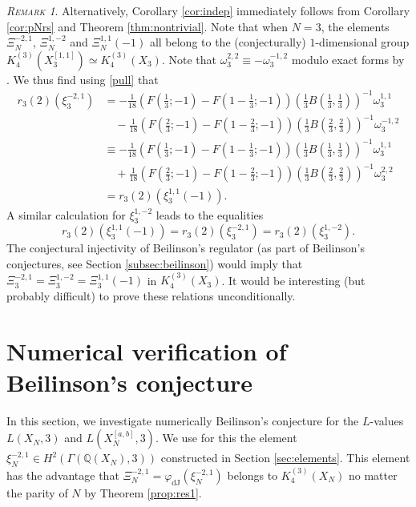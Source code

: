 \documentclass[11pt,a4,leqno]{amsart}
\theoremstyle{my theoremstyle}
\theoremstyle{dfn}
\theoremstyle{remark}
\newtheorem{rmk}[thm]{{\scshape Remark}}
\renewcommand{\1}{\mathbbm{1}}
\newcommand{\Q}{\mathbb{Q}}
\numberwithin{equation}{section}
\begin{document}
\begin{rmk}
Alternatively, Corollary \ref{cor:indep} immediately follows from Corollary \ref{cor:pNrs} and Theorem \ref{thm:nontrivial}. 
    Note that when $N=3$, the elements $\Xi_N^{-2,1}$, $\Xi_N^{1,-2}$ and $\Xi_N^{1,1}(-1)$ all belong to the (conjecturally) $1$-dimensional group $K_4^{(3)}(X_3^{[1,1]})\simeq K_4^{(3)}(X_3)$. Note that $\omega_3^{2,2}\equiv -\omega_3^{-1,2}$ modulo exact forms by \cite[Lemma 4.19]{Ots11}. We thus find using \eqref{pull} that 
    \begin{align*}
    r_3(2)(\xi_3^{-2,1})&=-\frac1{18} \left(  F\left(\frac{1}3; -1\right) - F\left(1-\frac{1}3; -1\right) \right) \left( \frac{1}{3} B\left( \frac{1}{3}, \frac{1}{3} \right)  \right)^{-1} \omega_3^{1, 1}\\
    &\quad -\frac1{18} \left(  F\left(\frac{2}3; -1\right) - F\left(1-\frac{2}3; -1\right) \right) \left( \frac{1}{3} B\left( \frac{2}{3}, \frac{2}{3} \right)  \right)^{-1} \omega_3^{-1, 2} \\
    &\equiv -\frac1{18} \left(  F\left(\frac{1}3; -1\right) - F\left(1-\frac{1}3; -1\right) \right) \left( \frac{1}{3} B\left( \frac{1}{3}, \frac{1}{3} \right)  \right)^{-1} \omega_3^{1, 1}\\
    &\quad +\frac1{18} \left(  F\left(\frac{2}3; -1\right) - F\left(1-\frac{2}3; -1\right) \right) \left( \frac{1}{3} B\left( \frac{2}{3}, \frac{2}{3} \right)  \right)^{-1} \omega_3^{2, 2} \\
    & = r_3(2)(\xi_3^{1,1}(-1)).
    \end{align*}
    A similar calculation for $\xi_3^{1,-2}$ leads to the equalities
    \[
    r_3(2)(\xi_3^{1,1}(-1))=r_3(2)(\xi_3^{-2,1})=r_3(2)(\xi_3^{1,-2}).
    \]
    The conjectural injectivity of Beilinson's regulator (as part of Beilinson's conjectures, see Section \ref{subsec:beilinson}) would imply that $\Xi_3^{-2,1}
    =\Xi_3^{1,-2}=\Xi_3^{1,1}(-1)$ in $K_4^{(3)}(X_3)$. It would be interesting (but probably difficult) to prove these relations unconditionally. 
\end{rmk}

\section{Numerical verification of Beilinson's conjecture} \label{sec:num}

In this section, we investigate numerically Beilinson's conjecture for the $L$-values $L(X_N, 3)$ and $L(X_N^{[a,b]}, 3)$. We use for this the element $\xi_N^{-2,1}\in H^2(\Gamma(\Q(X_N),3))$ constructed in Section \ref{sec:elements}. This element has the advantage that $\Xi_N^{-2,1}=\varphi_{\mathrm{dJ}}(\xi_N^{-2,1})$ belongs to $K_4^{(3)}(X_N)$ no matter the parity of $N$ by Theorem \ref{prop:res1}.
\end{document}
